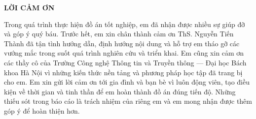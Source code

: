 \documentclass[../DoAn.tex]{subfiles}
\begin{document}
\begin{center}
    \Large{\textbf{LỜI CẢM ƠN}}\\
\end{center}
\vspace{1cm}

Trong quá trình thực hiện đồ án tốt nghiệp, em đã nhận được nhiều sự giúp đỡ
và góp ý quý báu. Trước hết, em xin chân thành cảm ơn ThS. Nguyễn Tiến Thành
đã tận tình hướng dẫn, định hướng nội dung và hỗ trợ em tháo gỡ các vướng mắc
trong suốt quá trình nghiên cứu và triển khai. Em cũng xin cảm ơn các thầy cô
của Trường Công nghệ Thông tin và Truyền thông --- Đại học Bách khoa Hà Nội vì
những kiến thức nền tảng và phương pháp học tập đã trang bị cho em. Em xin gửi
lời cảm ơn tới gia đình và bạn bè vì luôn động viên, tạo điều kiện về thời gian
và tinh thần để em hoàn thành đồ án đúng tiến độ. Những thiếu sót trong báo cáo
là trách nhiệm của riêng em và em mong nhận được thêm góp ý để hoàn thiện hơn.
\end{document}
